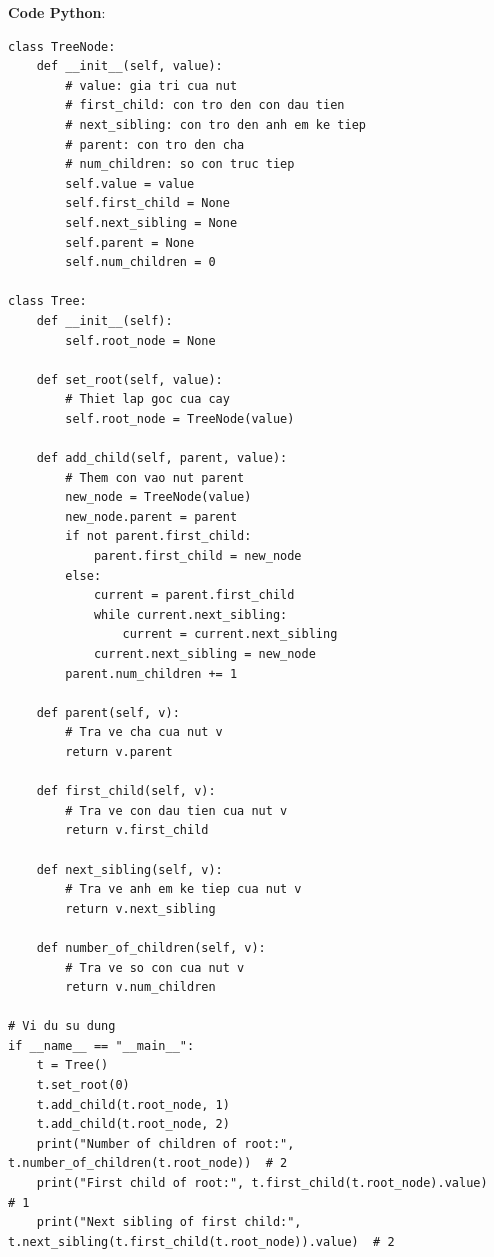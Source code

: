 \documentclass[a4paper,12pt]{article}
\begin{document}
\textbf{Code Python}:
\lstset{language=Python}
\begin{lstlisting}
class TreeNode:
    def __init__(self, value):
        # value: gia tri cua nut
        # first_child: con tro den con dau tien
        # next_sibling: con tro den anh em ke tiep
        # parent: con tro den cha
        # num_children: so con truc tiep
        self.value = value
        self.first_child = None
        self.next_sibling = None
        self.parent = None
        self.num_children = 0

class Tree:
    def __init__(self):
        self.root_node = None

    def set_root(self, value):
        # Thiet lap goc cua cay
        self.root_node = TreeNode(value)

    def add_child(self, parent, value):
        # Them con vao nut parent
        new_node = TreeNode(value)
        new_node.parent = parent
        if not parent.first_child:
            parent.first_child = new_node
        else:
            current = parent.first_child
            while current.next_sibling:
                current = current.next_sibling
            current.next_sibling = new_node
        parent.num_children += 1

    def parent(self, v):
        # Tra ve cha cua nut v
        return v.parent

    def first_child(self, v):
        # Tra ve con dau tien cua nut v
        return v.first_child

    def next_sibling(self, v):
        # Tra ve anh em ke tiep cua nut v
        return v.next_sibling

    def number_of_children(self, v):
        # Tra ve so con cua nut v
        return v.num_children

# Vi du su dung
if __name__ == "__main__":
    t = Tree()
    t.set_root(0)
    t.add_child(t.root_node, 1)
    t.add_child(t.root_node, 2)
    print("Number of children of root:", t.number_of_children(t.root_node))  # 2
    print("First child of root:", t.first_child(t.root_node).value)         # 1
    print("Next sibling of first child:", t.next_sibling(t.first_child(t.root_node)).value)  # 2
\end{lstlisting}
\end{document}
